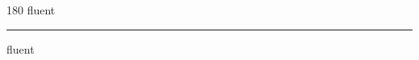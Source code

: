 
\begin{frame}
\begin{center}
\begin{turn}{180}
{\fontsize{2.5cm}{1em}\selectfont fluent}
\end{turn}
\vspace{1em}\par  
\hrule
\vspace{1em}\par  
{\fontsize{2.5cm}{1em}\selectfont fluent}
\end{center}
\end{frame}
